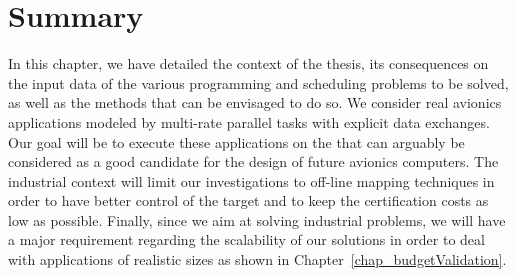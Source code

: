 \documentclass[main.tex]{subfiles}
\begin{document}
\section{Summary}
In this chapter, we have detailed the context of the thesis, its consequences
on the input data of the various programming and scheduling problems to be
solved, as well as the methods that can be envisaged to do so. We consider real
avionics applications modeled by multi-rate parallel tasks with explicit data
exchanges. Our goal will be to execute these applications on the \mppalong that
can arguably be considered as a good candidate for the design of future
avionics computers.  The industrial context will limit our investigations to
off-line mapping techniques in order to have better control of the target and
to keep the certification costs as low as possible. Finally, since we aim at
solving industrial problems, we will have a major requirement regarding the
scalability of our solutions in order to deal with applications of realistic
sizes as shown in Chapter~\ref{chap_budgetValidation}.


\clearpage
\subbiblio
\end{document}
